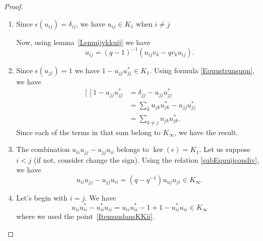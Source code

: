 \begin{proof}
    \begin{enumerate}
        \item
            Since $\epsilon(u_{ij})=\delta_{ij}$, we have $u_{ij}\in K_1$ when $i\neq j$

            Now, using lemma~\ref{Lemuijvkkuij} we have
            \begin{equation}
                u_{ij}=(q-1)^{-1}(u_{ij}v_k-qv_ku_{ij}).
            \end{equation}
        \item
            Since $\epsilon(u_{jj})=1$ we have $1-u_{jj}u_{jj}^*\in K_1$. Using formula \eqref{Equustrunsuqn}, we have
            \begin{equation}
                \begin{aligned}[]
                    1-u_{jj}u_{jj}^*&=\delta_{jj}-u_{jj}u_{jj}^*\\
                    &=\sum_ku_{jk}u_{jk}^*-u_{jj}u_{jj}^*\\
                    &=\sum_{k\neq j}u_{jk}u_{jk}^*.
                    \end{aligned}
            \end{equation}
            Since each of the terms in that sum belong to $K_{\infty}$, we have the result.
        \item
            The combination $u_{ii}u_{jj}-u_{jj}u_{ii}$ belongs to $\ker(\epsilon)=K_1$. Let us suppose $i<j$ (if not, consider change the sign). Using the relation \eqref{subEquuijcondiv}, we have
            \begin{equation}
                u_{ii}u_{jj}-u_{jj}u_{ii}=(q-q^{-1})u_{uj}u_{ji}\in K_{\infty}.
            \end{equation}
        \item
            Let's begin with $i=j$. We have
            \begin{equation}
                u_{ii}u_{ii}^*-u_{ii}^*u_{ii}=u_{ii}u_{ii}^*-1+1-u_{ii}^*u_{ii}\in K_{\infty}
            \end{equation}
            where we used the point~\ref{ItemuudansKKii}.


\end{enumerate}
\end{proof}
